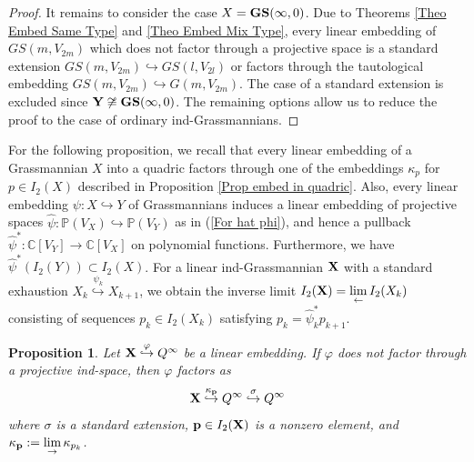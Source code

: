 \documentclass[12pt]{amsart}
\def\CC {{\mathbb C}}     %
\def\PP {{\mathbb P}}     %
\def\hw  {\hookrightarrow}
\newtheorem{prop}[theorem]{Proposition}
\begin{document}
\begin{proof}
It remains to consider the case $X={\bf GS}(\infty,0)$. Due to Theorems \ref{Theo Embed Same Type} and \ref{Theo Embed Mix Type}, every linear embedding of $GS(m,V_{2m})$ which does not factor through a projective space is a standard extension $GS(m,V_{2m})\hw GS(l,V_{2l})$ or factors through the tautological embedding $GS(m,V_{2m})\hw G(m,V_{2m})$. The case of a standard extension is excluded since ${\bf Y}\not\cong{\bf GS}(\infty,0)$. The remaining options allow us to reduce the proof to the case of ordinary ind-Grassmannians.
\end{proof}


For the following proposition, we recall that every linear embedding of a Grassmannian $X$ into a quadric factors through one of the embeddings $\kappa_p$ for $p\in I_2(X)$ described in Proposition \ref{Prop embed in quadric}. Also, every linear embedding $\psi:X\hw Y$ of Grassmannians induces a linear embedding of projective spaces $\hat\psi:\PP(V_X)\hw \PP(V_{Y})$ as in (\ref{For hat phi}), and hence a pullback $\hat\psi^*:\CC[V_{Y}]\to \CC[V_{X}]$ on polynomial functions. Furthermore, we have $\hat\psi^*(I_2(Y))\subset I_2(X)$. For a linear ind-Grassmannian ${\bf X}$ with a standard exhaustion $X_k\stackrel{\psi_k}{\hw} X_{k+1}$, we obtain the inverse limit $I_2({\bf X})=\lim\limits_{\leftarrow} I_2(X_k)$ consisting of sequences $p_k\in I_2(X_k)$ satisfying $p_k=\hat \psi_k^* p_{k+1}$.

\begin{prop}\label{Prop ind Emb in Q}
Let ${\bf X}\stackrel{\varphi}{\hw} Q^\infty$ be a linear embedding. If $\varphi$ does not factor through a projective ind-space, then $\varphi$ factors as
$$
{\bf X} \stackrel{\kappa_{\bf p}}{\hw} Q^\infty \stackrel{\sigma}{\hw} Q^\infty 
$$
where $\sigma$ is a standard extension, ${\bf p}\in I_2({\bf X})$ is a nonzero element, and $\kappa_{\bf p}:=\lim\limits_\to \kappa_{p_k}$.
\end{prop}
\end{document}
